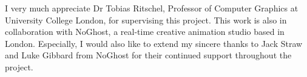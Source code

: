 \begin{acknowledgements}
I very much appreciate Dr Tobias Ritschel, Professor of Computer Graphics at University College London, for supervising this project. This work is also in collaboration with NoGhost, a real-time creative animation studio based in London. Especially, I would also like to extend my sincere thanks to Jack Straw and Luke Gibbard from NoGhost for their continued support throughout the project.
\end{acknowledgements}



\setcounter{tocdepth}{2} 

\tableofcontents

\listoffigures





